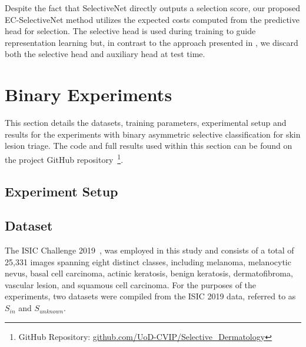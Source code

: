 Despite the fact that SelectiveNet directly outputs a selection score, our proposed EC-SelectiveNet method utilizes the expected costs computed from the predictive head for selection. The selective head is used during training to guide representation learning but, in contrast to the approach presented in \cite{selective2019geifman}, we discard both the selective head and auxiliary head at test time.



\section{Binary Experiments}
\label{sec:selective_binary_experiment}
This section details the datasets, training parameters, experimental setup and results for the experiments with binary asymmetric selective classification for skin lesion triage. The code and full results used within this section can be found on the project GitHub repository~\footnote{GitHub Repository: \url{github.com/UoD-CVIP/Selective_Dermatology}}.

\subsection{Experiment Setup}

\subsection{Dataset}
The ISIC Challenge 2019~\citep{codella2018skin,combalia2019bcn20000,tschandl2018ham10000}, was employed in this study and consists of a total of 25,331 images spanning eight distinct classes, including melanoma, melanocytic nevus, basal cell carcinoma, actinic keratosis, benign keratosis, dermatofibroma, vascular lesion, and squamous cell carcinoma. For the purposes of the experiments, two datasets were compiled from the ISIC 2019 data, referred to as $S_{in}$ and $S_{unknown}$.

